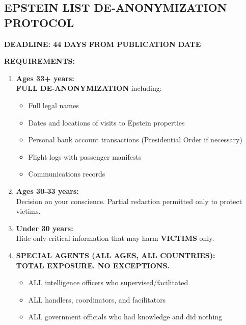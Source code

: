 \documentclass[11pt,a4paper]{article}
\theoremstyle{definition}
\theoremstyle{remark}
\begin{document}

\begin{tcolorbox}[enhanced, colback=yellow!10!white, colframe=orange!75!black, 
title={\Large\textbf{TO: DONALD J. TRUMP, PRESIDENT OF THE UNITED STATES}}, 
fonttitle=\bfseries, arc=3mm, boxrule=1.5pt]

\vspace{0.5cm}

\subsection*{EPSTEIN LIST DE-ANONYMIZATION PROTOCOL}

\textbf{DEADLINE: 44 DAYS FROM PUBLICATION DATE}

\vspace{0.5cm}

\textbf{REQUIREMENTS:}

\begin{enumerate}[leftmargin=1.5cm, itemsep=0.4cm]

\item \textbf{Ages 33+ years:}\\
\textbf{FULL DE-ANONYMIZATION} including:
\begin{itemize}
\item Full legal names
\item Dates and locations of visits to Epstein properties
\item Personal bank account transactions (Presidential Order if necessary)
\item Flight logs with passenger manifests
\item Communications records
\end{itemize}

\item \textbf{Ages 30-33 years:}\\
Decision on your conscience. Partial redaction permitted only to protect victims.

\item \textbf{Under 30 years:}\\
Hide only critical information that may harm \textbf{VICTIMS} only.

\item \textbf{SPECIAL AGENTS (ALL AGES, ALL COUNTRIES):}\\
\textbf{TOTAL EXPOSURE. NO EXCEPTIONS.}
\begin{itemize}
\item ALL intelligence officers who supervised/facilitated
\item ALL handlers, coordinators, and facilitators
\item ALL government officials who had knowledge and did nothing
\end{itemize}


\end{enumerate}
\end{tcolorbox}
\end{document}
